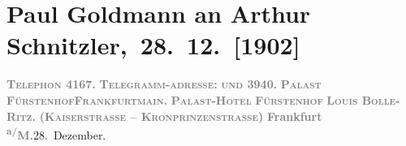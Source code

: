 

         
         \renewcommand{\erwaehntePersonen}{Personen:  ?? [Partner von Theodore Rottenberg, Ende 1902/Anfang 1903], Louis Bolle-Ritz, Paul Goldmann, Theodore Rottenberg, Olga Schnitzler}
         \renewcommand{\erwaehnteInstitutionen}{Institutionen: Hotel Fürstenhof}
         \renewcommand{\erwaehnteOrte}{Orte: Frankfurt am Main, Fürstenhof, Kaiserstraße, Münchener Straße, Wien}
         \renewcommand{\erwaehnteWerke}{Werke: Neue Freie Presse}
               \section[ Paul Goldmann an Arthur Schnitzler, 28. 12. {[}1902{]}]{ Paul Goldmann an Arthur Schnitzler, 28. 12. {[}1902{]}}\nopagebreak{}\rehead{ }\begin{ledgroupsized}[t]{13cm}\normalsize\beginnumbering \toendnotes[C]{\smallbreak\pagebreak[2]} 
\toendnotes[C]{\smallbreak}\pstart
           \noindent{}{\pb}\textcolor{gray}{\textbf{\textsc{Telephon}{ }4167. }}\hfill \textcolor{gray}{\textbf{\textsc{Telegramm-adresse}:}}\pend
           \pstart
           \textcolor{gray}{\textbf{\textsc{und}{ }3940. }}\hfill \textcolor{gray}{\textbf{\textsc{Palast FürstenhofFrankfurtmain. }}}\pend
           \pstart
           \centering{}\textcolor{gray}{\textbf{\textsc{\textbf{Palast-Hotel}}}}\pend
           \pstart
           \noindent{}\centering{}\textcolor{gray}{\textbf{\textsc{Fürstenhof}}}\pend
           \pstart
           \noindent{}\centering{}\textcolor{gray}{\textbf{\textsc{Louis Bolle-Ritz.}}}\pend
           \pstart
           \noindent{}\centering{}\textcolor{gray}{\textbf{(\textsc{Kaiserstrasse – Kronprinzenstrasse})}}\pend
           \pstart
           \raggedleft{}\textcolor{gray}{\textbf{Frankfurt \textsuperscript{a/}M.}}28. Dezember.\pend

\end{ledgroupsized}
